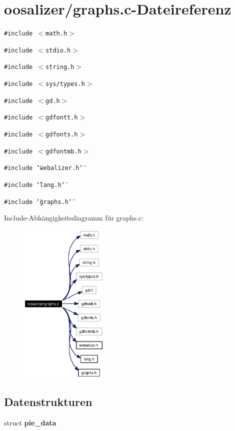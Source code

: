 \section{oosalizer/graphs.c-Dateireferenz}
\label{graphs_8c}
{\tt \#include $<$math.h$>$}\par
{\tt \#include $<$stdio.h$>$}\par
{\tt \#include $<$string.h$>$}\par
{\tt \#include $<$sys/types.h$>$}\par
{\tt \#include $<$gd.h$>$}\par
{\tt \#include $<$gdfontt.h$>$}\par
{\tt \#include $<$gdfonts.h$>$}\par
{\tt \#include $<$gdfontmb.h$>$}\par
{\tt \#include \char`\"{}webalizer.h\char`\"{}}\par
{\tt \#include \char`\"{}lang.h\char`\"{}}\par
{\tt \#include \char`\"{}graphs.h\char`\"{}}\par


Include-Abh\"{a}ngigkeitsdiagramm f\"{u}r graphs.c:\begin{figure}[H]
\begin{center}
\leavevmode
\includegraphics[width=119pt]{graphs_8c__incl}
\end{center}
\end{figure}
\subsection*{Datenstrukturen}
\begin{CompactItemize}
\item 
struct {\bf pie\_\-data}
\end{CompactItemize}

